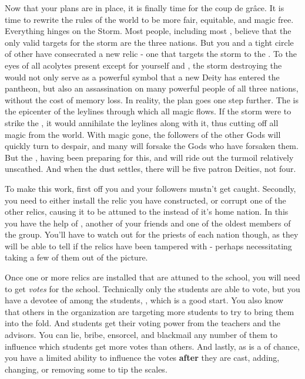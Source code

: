 \documentclass[char]{GL2020}
\begin{document}
Now that your plans are in place, it is finally time for the coup de grâce. It is time to rewrite the rules of the world to be more fair, equitable, and magic free. Everything hinges on the Storm. Most people, including most \pGoaties{}, believe that the only valid targets for the storm are the three nations. But you and a tight circle of other \pGoaties{} have consecrated a new relic - one that targets the storm to the \pSchool{}. To the eyes of all acolytes present except for yourself and \cChupSecond{}, the storm destroying the \pSc{} would not only serve as a powerful symbol that a new Deity has entered the pantheon, but also an assassination on many powerful people of all three nations, without the cost of memory loss. In reality, the plan goes one step further. The \pSc{} is the epicenter of the leylines through which all magic flows. If the storm were to strike the \pSc{}, it would annihilate the leylines along with it, thus cutting off all magic from the world. With magic gone, the followers of the other Gods will quickly turn to despair, and many will forsake the Gods who have forsaken them. But the \pGoaties{}, having been preparing for this, and will ride out the turmoil relatively unscathed. And when the dust settles, there will be five patron Deities, not four.

To make this work, first off you and your followers mustn't get caught. Secondly, you need to either install the relic you have constructed, or corrupt one of the other relics, causing it to be attuned to the \pSc{} instead of it’s home nation. In this you have the help of \cChupInventor{}, another of your friends and one of the oldest members of the group. You’ll have to watch out for the priests of each nation though, as they will be able to tell if the relics have been tampered with - perhaps necessitating taking a few of them out of the picture.

Once one or more relics are installed that are attuned to the school, you will need to get \emph{votes} for the school. Technically only the students are able to vote, but you have a devotee of \cGenesis{} among the students, \cChupStudent{}, which is a good start. You also know that others in the organization are targeting more students to try to bring them into the fold. And students get their voting power from the teachers and the advisors. You can lie, bribe, ensorcel, and blackmail any number of them to influence which students get more votes than others. And lastly, as \cGenesis{} is a \cGenesis{\God} of chance, you have a limited ability to influence the votes \textbf{after} they are cast, adding, changing, or removing some to tip the scales.
\end{document}
